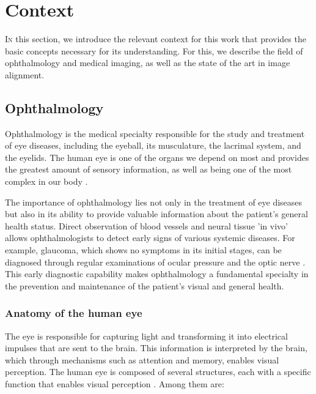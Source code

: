 \chapter{Context}
\label{chap:contexto}

\lettrine{I}{n} this section, we introduce the relevant context for this work that provides the basic concepts necessary for its understanding.
For this, we describe the field of ophthalmology and medical imaging, as well as the state of the art in image alignment.

\section{Ophthalmology}
\label{sec:Oftalmoloxía}
Ophthalmology is the medical specialty responsible for the study and treatment of eye diseases, including the eyeball, its musculature, the lacrimal system, and the eyelids.
The human eye is one of the organs we depend on most and provides the greatest amount of sensory information, as well as being one of the most complex in our body \cite{kanski2011clinical}.

The importance of ophthalmology lies not only in the treatment of eye diseases but also in its ability to provide valuable information about the patient's general health status.
Direct observation of blood vessels and neural tissue 'in vivo' allows ophthalmologists to detect early signs of various systemic diseases.
For example, glaucoma, which shows no symptoms in its initial stages, can be diagnosed through regular examinations of ocular pressure and the optic nerve \cite{importglaucoma}.
This early diagnostic capability makes ophthalmology a fundamental specialty in the prevention and maintenance of the patient's visual and general health.

\subsection{Anatomy of the human eye}
\label{subsec:Anatomía do ollo humano}
The eye is responsible for capturing light and transforming it into electrical impulses that are sent to the brain.
This information is interpreted by the brain, which through mechanisms such as attention and memory, enables visual perception. \cite{eyefunct}
The human eye is composed of several structures, each with a specific function that enables visual perception \cite{eyeanat}. Among them are:

